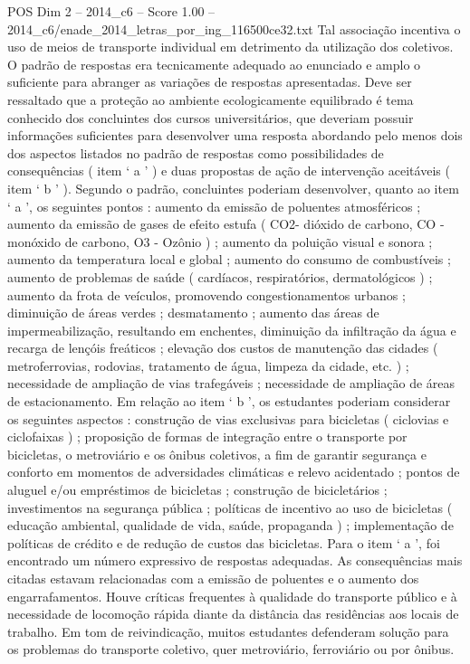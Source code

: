 \begin{textsample}{POS Dim 2 – 2014\_c6 – Score 1.00 – 2014\_c6/enade\_2014\_letras\_por\_ing\_116500ce32.txt}
Tal associação incentiva o uso de meios de transporte individual em detrimento da utilização dos coletivos.
O padrão de respostas era tecnicamente adequado ao enunciado e amplo o suficiente para abranger as variações de respostas apresentadas.
Deve ser ressaltado que a proteção ao ambiente ecologicamente equilibrado é tema conhecido dos concluintes dos cursos universitários, que deveriam possuir informações suficientes para desenvolver uma resposta abordando pelo menos dois dos aspectos listados no padrão de respostas como possibilidades de consequências ( item ‘ a ’ ) e duas propostas de ação de intervenção aceitáveis ( item ‘ b ’ ).
Segundo o padrão, concluintes poderiam desenvolver, quanto ao item ‘ a ’, os seguintes pontos : aumento da emissão de poluentes atmosféricos ; aumento da emissão de gases de efeito estufa ( CO2- dióxido de carbono, CO - monóxido de carbono, O3 - Ozônio ) ; aumento da poluição visual e sonora ; aumento da temperatura local e global ; aumento do consumo de combustíveis ; aumento de problemas de saúde ( cardíacos, respiratórios, dermatológicos ) ; aumento da frota de veículos, promovendo congestionamentos urbanos ; diminuição de áreas verdes ; desmatamento ; aumento das áreas de impermeabilização, resultando em enchentes, diminuição da infiltração da água e recarga de lençóis freáticos ; elevação dos custos de manutenção das cidades ( metroferrovias, rodovias, tratamento de água, limpeza da cidade, etc. ) ; necessidade de ampliação de vias trafegáveis ; necessidade de ampliação de áreas de estacionamento.
Em relação ao item ‘ b ’, os estudantes poderiam considerar os seguintes aspectos : construção de vias exclusivas para bicicletas ( ciclovias e ciclofaixas ) ; proposição de formas de integração entre o transporte por bicicletas, o metroviário e os ônibus coletivos, a fim de garantir segurança e conforto em momentos de adversidades climáticas e relevo acidentado ; pontos de aluguel e/ou empréstimos de bicicletas ; construção de bicicletários ; investimentos na segurança pública ; políticas de incentivo ao uso de bicicletas ( educação ambiental, qualidade de vida, saúde, propaganda ) ; implementação de políticas de crédito e de redução de custos das bicicletas.
Para o item ‘ a ’, foi encontrado um número expressivo de respostas adequadas.
As consequências mais citadas estavam relacionadas com a emissão de poluentes e o aumento dos engarrafamentos.
Houve críticas frequentes à qualidade do transporte público e à necessidade de locomoção rápida diante da distância das residências aos locais de trabalho.
Em tom de reivindicação, muitos estudantes defenderam solução para os problemas do transporte coletivo, quer metroviário, ferroviário ou por ônibus.

\end{textsample}
